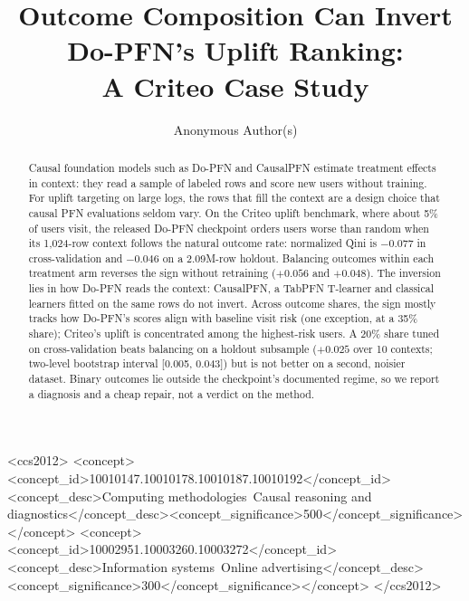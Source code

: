 \documentclass[sigconf,anonymous,review]{acmart}
\DeclareRobustCommand{\dopfn}{\mbox{Do-PFN}\xspace}
\begin{document}
\title[Outcome Composition Can Invert Do-PFN's Uplift Ranking]{Outcome Composition Can Invert Do-PFN's Uplift Ranking:\texorpdfstring{\\}{ }A Criteo Case Study}

\author{Anonymous Author(s)}

\begin{abstract}
Causal foundation models such as \dopfn and CausalPFN estimate treatment effects in context: they read a sample of labeled rows and score new users without training. For uplift targeting on large logs, the rows that fill the context are a design choice that causal PFN evaluations seldom vary. On the Criteo uplift benchmark, where about 5\% of users visit, the released \dopfn checkpoint orders users worse than random when its 1,024-row context follows the natural outcome rate: normalized Qini is $-0.077$ in cross-validation and $-0.046$ on a 2.09M-row holdout. Balancing outcomes within each treatment arm reverses the sign without retraining ($+0.056$ and $+0.048$). The inversion lies in how \dopfn reads the context: CausalPFN, a TabPFN T-learner and classical learners fitted on the same rows do not invert. Across outcome shares, the sign mostly tracks how \dopfn's scores align with baseline visit risk (one exception, at a 35\% share); Criteo's uplift is concentrated among the highest-risk users. A 20\% share tuned on cross-validation beats balancing on a holdout subsample ($+0.025$ over 10 contexts; two-level bootstrap interval [0.005, 0.043]) but is not better on a second, noisier dataset. Binary outcomes lie outside the checkpoint's documented regime, so we report a diagnosis and a cheap repair, not a verdict on the method.
\end{abstract}

\begin{CCSXML}
<ccs2012>
<concept><concept_id>10010147.10010178.10010187.10010192</concept_id>
<concept_desc>Computing methodologies~Causal reasoning and diagnostics</concept_desc><concept_significance>500</concept_significance></concept>
<concept><concept_id>10002951.10003260.10003272</concept_id>
<concept_desc>Information systems~Online advertising</concept_desc><concept_significance>300</concept_significance></concept>
</ccs2012>
\end{CCSXML}

\end{document}
